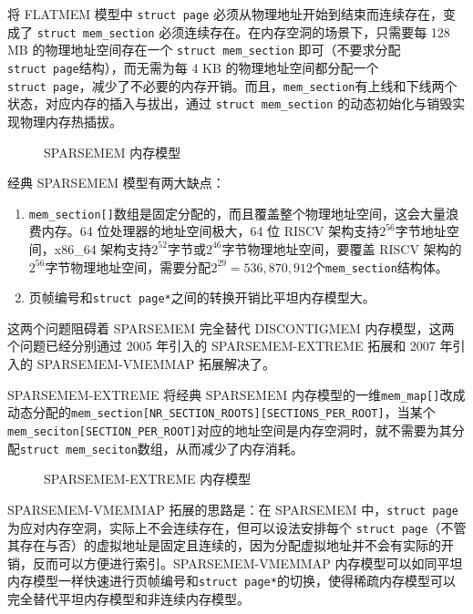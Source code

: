 \documentclass[AutoFakeBold]{LZUThesis}
\begin{document}
\begin{sloppypar}
将 FLATMEM 模型中 \texttt{struct\ page}
必须从物理地址开始到结束而连续存在，变成了 \texttt{struct\ mem\_section}
必须连续存在。在内存空洞的场景下，只需要每 128 MB 的物理地址空间存在一个
\texttt{struct\ mem\_section}
即可（不要求分配\texttt{struct\ page}结构），而无需为每 4 KB
的物理地址空间都分配一个
\texttt{struct\ page}，减少了不必要的内存开销。而且，\texttt{mem\_section}有上线和下线两个状态，对应内存的插入与拔出，通过
\texttt{struct\ mem\_section} 的动态初始化与销毁实现物理内存热插拔。

\begin{figure}
\centering

\caption{SPARSEMEM 内存模型}
\end{figure}

经典 SPARSEMEM 模型有两大缺点：

\begin{enumerate}
\def\labelenumi{\arabic{enumi}.}
\item
  \texttt{mem\_section{[}{]}}数组是固定分配的，而且覆盖整个物理地址空间，这会大量浪费内存。64
  位处理器的地址空间极大，64 位 RISCV
  架构支持\(2^{56}\)字节地址空间，x86\_64
  架构支持\(2^{52}\)字节或\(2^{46}\)字节物理地址空间，要覆盖 RISCV
  架构的\(2^{56}\)字节物理地址空间，需要分配\(2^{29} = 536,870,912\)个\texttt{mem\_section}结构体。
\item
  页帧编号和\texttt{struct\ page*}之间的转换开销比平坦内存模型大。
\end{enumerate}

这两个问题阻碍着 SPARSEMEM 完全替代 DISCONTIGMEM
内存模型，这两个问题已经分别通过 2005 年引入的 SPARSEMEM-EXTREME 拓展和
2007 年引入的 SPARSEMEM-VMEMMAP 拓展解决了。

SPARSEMEM-EXTREME 将经典 SPARSEMEM
内存模型的一维\texttt{mem\_map{[}{]}}改成动态分配的\texttt{mem\_section{[}NR\_SECTION\_ROOTS{]}{[}SECTIONS\_PER\_ROOT{]}}，当某个\texttt{mem\_seciton{[}SECTION\_PER\_ROOT{]}}对应的地址空间是内存空洞时，就不需要为其分配\texttt{struct\ mem\_seciton}数组，从而减少了内存消耗。

\begin{figure}
\centering

\caption{SPARSEMEM-EXTREME 内存模型}
\end{figure}

SPARSEMEM-VMEMMAP 拓展的思路是：在 SPARSEMEM 中，\texttt{struct\ page}
为应对内存空洞，实际上不会连续存在，但可以设法安排每个
\texttt{struct\ page}（不管其存在与否）的虚拟地址是固定且连续的，因为分配虚拟地址并不会有实际的开销，反而可以方便进行索引。SPARSEMEM-VMEMMAP
内存模型可以如同平坦内存模型一样快速进行页帧编号和\texttt{struct\ page*}的切换，使得稀疏内存模型可以完全替代平坦内存模型和非连续内存模型。


\end{sloppypar}
\end{document}
